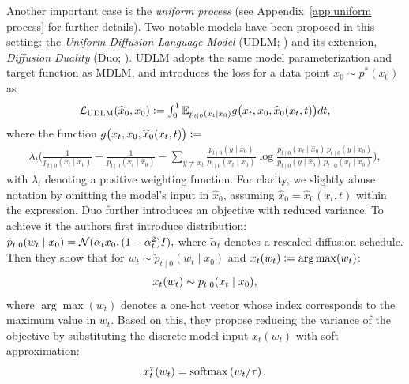   Another important case is the \textit{uniform process} (see Appendix~\ref{app:uniform process} for further details). Two notable models have been proposed in this setting: the \textit{Uniform Diffusion Language Model} (UDLM; \citealp{schiff2024discreteguidance}) and its extension, \textit{Diffusion Duality} (Duo; \citealp{sahoo2025the}). UDLM adopts the same model parameterization and target function as MDLM, and introduces the loss for a data point $x_0 \sim p^*(x_0)$ as
  \begin{equation}
    \mathcal{L}_{\text{UDLM}}(\widehat{x}_0,x_0) \vcentcolon= \textstyle \int_0^1 \mathbb{E}_{p_{t|0}(x_t \mid x_0)} g\bigl(x_t, x_0, \widehat{x}_0(x_t, t)\bigr) dt,
  \label{eq:udlm loss}
  \end{equation}
  where the function $g\bigl(x_t, x_0, \widehat{x}_0(x_t, t)\bigr) \vcentcolon=$
  \begin{gather}
       \lambda_{t}\Bigg(\frac{1}{p_{t\mid0}(x_t \mid x_0)} - \frac{1}{p_{t \mid 0}(x_t \mid \widehat{x}_0)}
          - \sum_{y \neq x_t} \frac{p_{t \mid 0}(y \mid x_0)}{p_{t\mid0}(x_t \mid x_0)}\log\frac{p_{t \mid 0}(x_t \mid \widehat{x}_0) \, p_{t \mid 0}(y \mid x_0)}{p_{t \mid 0}(y \mid \widehat{x}_0) \, p_{t \mid 0}(x_t \mid x_0)}\Bigg), \nonumber
  \end{gather}
  with $\lambda_t$ denoting a positive weighting function. For clarity, we slightly abuse notation by omitting
the model's input in $\widehat{x}_0$, assuming $\widehat{x}_0 = \widehat{x}_0(x_t, t)$ within the expression.
  Duo further introduces an objective with reduced variance. To achieve it the authors first introduce distribution:
$
    \tilde{p}_{t\mid 0}(w_t \mid x_0) = \mathcal{N}(\tilde{\alpha}_t x_0, (1-\tilde{\alpha}_t^2)I), \nonumber
$
  where $\tilde{\alpha}_t$ denotes a rescaled diffusion schedule. Then they show that for $w_t \sim \tilde{p}_{t\mid 0}(w_t \mid x_0)$ and $x_t(w_t) \vcentcolon= \arg\max(w_t)$:
\vspace{-0.5mm}
\[
    x_t(w_t) \sim p_{t|0}(x_t \mid x_0),
  \vspace{-1mm}
  \]
  where $\arg\max(w_t)$ denotes a one-hot vector whose index corresponds to the maximum value in $w_t$. Based on this, they propose reducing the variance of the objective by substituting the discrete model input $x_t(w_t)$ with soft approximation:
  \begin{equation}
    x^{\tau}_{t}(w_t) = \mathrm{softmax}\left({w_t}/{\tau}\right). \nonumber
    \vspace{-2mm}
  \end{equation} 

